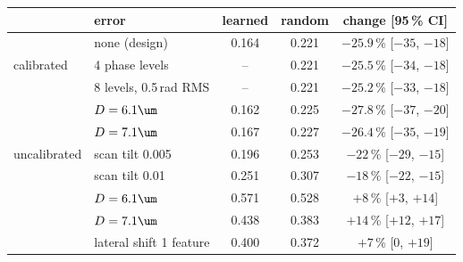 \begin{tabular}{@{}l l cc c@{}}\toprule
 & error & learned & random & change [95\,\% CI]\\\midrule
 & none (design) & 0.164 & 0.221 & $-25.9$\,\% [$-35$, $-18$]\\\midrule
calibrated & 4 phase levels & -- & 0.221 & $-25.5$\,\% [$-34$, $-18$]\\
 & 8 levels, 0.5\,rad RMS & -- & 0.221 & $-25.2$\,\% [$-33$, $-18$]\\
 & $D=6.1\um$ & 0.162 & 0.225 & $-27.8$\,\% [$-37$, $-20$]\\
 & $D=7.1\um$ & 0.167 & 0.227 & $-26.4$\,\% [$-35$, $-19$]\\\midrule
uncalibrated & scan tilt 0.005 & 0.196 & 0.253 & $-22$\,\% [$-29$, $-15$]\\
 & scan tilt 0.01 & 0.251 & 0.307 & $-18$\,\% [$-22$, $-15$]\\
 & $D=6.1\um$ & 0.571 & 0.528 & $+8$\,\% [$+3$, $+14$]\\
 & $D=7.1\um$ & 0.438 & 0.383 & $+14$\,\% [$+12$, $+17$]\\
 & lateral shift 1 feature & 0.400 & 0.372 & $+7$\,\% [$0$, $+19$]\\
\bottomrule\end{tabular}
